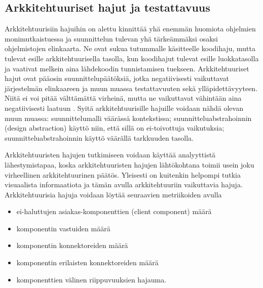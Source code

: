 \documentclass[finnish]{tktltiki2}
\numberwithin{table}{section}
\theoremstyle{definition}
\theoremstyle{remark}
\begin{document}
\subsection{Arkkitehtuuriset hajut ja testattavuus} \label{arch_smells_and_testability}

Arkkitehtuurisiin hajuihin on alettu kinnittää yhä enemmän huomiota ohjelmien monimutkaistuessa ja suunnittelun tulevan yhä tärkeämmäksi osaksi ohjelmistojen elinkaarta. Ne ovat sukua tutummalle käsitteelle koodihaju, mutta tulevat esille arkkitehtuurisella tasolla, kun koodihajut tulevat esille luokkatasolla ja vaativat melkein aina lähdekoodin tunnistamisen tuekseen. Arkkitehtuuriset hajut ovat pääosin suunnittelupäätöksiä, jotka negatiivisesti vaikuttavat järjestelmän elinkaareen ja muun muassa testattavuuten sekä ylläpidettävyyteen. Niitä ei voi pitää välttämättä virheinä, mutta ne vaikuttavat vähintään aina negatiivisesti laatuun \citep{de_andrade_architectural_2014}. Syitä arkkitehtuurisille hajuille voidaan nähdä olevan muun muassa: suunnittelumalli väärässä kontekstissa;  suunnitteluabstrahoinnin (design abstraction) käyttö niin, että sillä on ei-toivottuja vaikutuksia; suunnitteluabstrahoinnin käyttö väärällä tarkkuuden tasolla.


 Arkkitehtuuristen hajujen tutkimiseen voidaan käyttää analyyttistä lähestymistapaa, koska arkkitehtuuristen hajujen lähtökohtana toimii usein joku virheellinen arkkitehtuurinen päätös. Yleisesti on kuitenkin helpompi tutkia visuaalista informaatiota ja tämän avulla arkkitehtuuriin vaikuttavia hajuja. Arkkitehtuurisia hajuja voidaan löytää seuraavien metriikoiden avulla \citep{bertran_detecting_2011}

\begin{itemize}
	\item ei-haluttujen asiakas-komponenttien (client component) määrä
	\item komponentin vastuiden määrä
	\item komponentin konnektoreiden määrä
	\item komponentin erilaisten konnektoreiden määrä
	\item komponenttien välinen riippuvuuksien hajauma.
\end{itemize}

\end{document}
